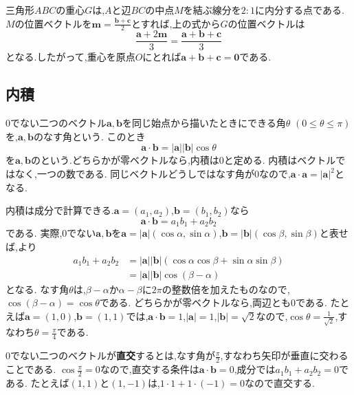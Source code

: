 三角形$ABC$の重心$G$は,$A$と辺$BC$の中点$M$を結ぶ線分を$2:1$に内分する点である.
$M$の位置ベクトルを$\boldsymbol m=\frac{\boldsymbol b+\boldsymbol c}{2}$とすれば,上の式から$G$の位置ベクトルは
\[
  \frac{\boldsymbol a+2\boldsymbol m}{3}
  =\frac{\boldsymbol a+\boldsymbol b+\boldsymbol c}{3}
\]
となる.したがって,重心を原点$O$にとれば$\boldsymbol a+\boldsymbol b+\boldsymbol c=\boldsymbol 0$である.

\subsection{内積}\label{節：内積}
0でない二つのベクトル$\boldsymbol a,\boldsymbol b$を同じ始点から描いたときにできる角$\theta$ $(0\le\theta\le\pi)$を,$\boldsymbol a,\boldsymbol b$のなす角という.
このとき
\[
  \boldsymbol a\cdot\boldsymbol b=|\boldsymbol a||\boldsymbol b|\cos\theta
\]
を$\boldsymbol a,\boldsymbol b$の\textbf{}という.どちらかが零ベクトルなら,内積は$0$と定める.
内積はベクトルではなく,一つの数である.
同じベクトルどうしではなす角が$0$なので,$\boldsymbol a\cdot\boldsymbol a=|\boldsymbol a|^2$となる.

内積は成分で計算できる.$\boldsymbol a=(a_1,a_2)$,$\boldsymbol b=(b_1,b_2)$なら
\[
  \boldsymbol a\cdot\boldsymbol b=a_1b_1+a_2b_2
\]
である.
実際,0でない$\boldsymbol a,\boldsymbol b$を$\boldsymbol a=|\boldsymbol a|(\cos\alpha,\sin\alpha)$,$\boldsymbol b=|\boldsymbol b|(\cos\beta,\sin\beta)$と表せば,より
\[
  \begin{aligned}
    a_1b_1+a_2b_2
    &=|\boldsymbol a||\boldsymbol b|(\cos\alpha\cos\beta+\sin\alpha\sin\beta)\\
    &=|\boldsymbol a||\boldsymbol b|\cos(\beta-\alpha)
  \end{aligned}
\]
となる.
なす角$\theta$は,$\beta-\alpha$か$\alpha-\beta$に$2\pi$の整数倍を加えたものなので,$\cos(\beta-\alpha)=\cos\theta$である.
どちらかが零ベクトルなら,両辺とも$0$である.
たとえば$\boldsymbol a=(1,0)$,$\boldsymbol b=(1,1)$では,$\boldsymbol a\cdot\boldsymbol b=1$,$|\boldsymbol a|=1$,$|\boldsymbol b|=\sqrt2$なので,$\cos\theta=\frac{1}{\sqrt2}$,すなわち$\theta=\frac{\pi}{4}$である.

0でない二つのベクトルが\textbf{直交}するとは,なす角が$\frac{\pi}{2}$,すなわち矢印が垂直に交わることである.
$\cos\frac{\pi}{2}=0$なので,直交する条件は$\boldsymbol a\cdot\boldsymbol b=0$,成分では$a_1b_1+a_2b_2=0$である.
たとえば$(1,1)$と$(1,-1)$は,$1\cdot1+1\cdot(-1)=0$なので直交する.

